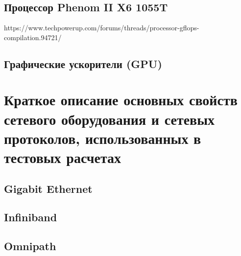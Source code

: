 \section{Процессор Phenom II X6 1055T}
https://www.techpowerup.com/forums/threads/processor-gflops-compilation.94721/

\section{Графические ускорители (GPU)}



\chapter{Краткое описание основных свойств сетевого оборудования и сетевых протоколов, использованных в тестовых расчетах} \label{AppendixB}

\section{Gigabit Ethernet}
\section{Infiniband}
\section{Omnipath}


